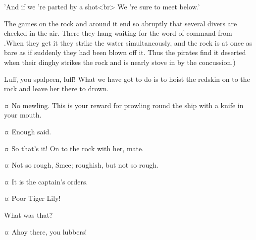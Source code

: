 \begin{drama}
\begin{stagedir}
\begin{drama}
\speakercontinues
'And if we 're parted by a shot<br>
We 're sure to meet below.'
\end{drama}

The games on the rock and around it end so abruptly that several divers are checked in the air.
There they hang waiting for the word of command from \peter.When they get it they strike the water simultaneously, and the rock is at once as bare as if suddenly they had been blown off it.
Thus the pirates find it deserted when their dinghy strikes the rock and is nearly stove in by the concussion.)
\end{stagedir}

\smeespeaks
Luff, you spalpeen, luff!
What we have got to do is to hoist the redskin on to the rock and leave her there to drown.


\starkeyspeaks {}¤
No mewling.
This is your reward for prowling round the ship with a knife in your mouth.

\tigerlilyspeaks {}¤
Enough said.

\smeespeaks {}¤
So that's it!
On to the rock with her, mate.

\starkeyspeaks {}¤
Not so rough, Smee; roughish, but not so rough.

\smeespeaks {}¤
It is the captain's orders.


\wendyspeaks {}¤
Poor Tiger Lily!

\starkeyspeaks
What was that?

\peterspeaks {}¤
Ahoy there, you lubbers!


\end{drama}
